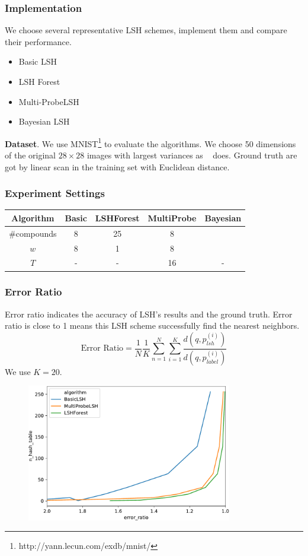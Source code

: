 \begin{frame}
\frametitle{Implementation}
We choose several representative LSH schemes, implement them and compare their performance.
\begin{multicols}{2}
\begin{itemize}
	\item Basic LSH
	\item LSH Forest
	\item Multi-ProbeLSH
	\item Bayesian LSH
\end{itemize}
\end{multicols}

\textbf{Dataset}. We use MNIST\footnote{http://yann.lecun.com/exdb/mnist/} to evaluate the algorithms. We choose 50 dimensions of the original $28\times28$ images with largest variances as ~\cite{gan2012locality} does. Ground truth are got by linear scan in the training set with Euclidean distance.
\end{frame}

\begin{frame}
	\frametitle{Experiment Settings}
	\begin{table}
		\begin{tabular}{ccccc}
			\hline
			Algorithm & Basic & LSHForest & MultiProbe & Bayesian \\ \hline
			\#compounds & 8 & 25 & 8 & \\\hline
			$w$ & 8 & 1 & 8 & \\\hline
			$T$ & - & - & 16 & - \\ \hline
		\end{tabular}
	\end{table}
\end{frame}

\begin{frame}[allowframebreaks]
\frametitle{Error Ratio}
Error ratio indicates the accuracy of LSH's results and the ground truth.
Error ratio is close to 1 means this LSH scheme successfully find the nearest neighbors.
	\begin{equation}
		\text{Error Ratio}=\frac{1}{N}\frac{1}{K}\sum_{n=1}^{N}\sum_{i=1}^{K}\frac{d(q, p_{lsh}^{(i)})}{d(q, p_{label}^{(i)})}
	\end{equation}
We use $K=20$.

\pagebreak
\begin{figure}
\includegraphics[width=0.8\textwidth]{figures/error_ratio}
\end{figure}
\end{frame}


